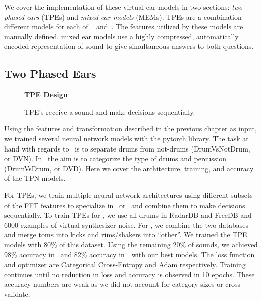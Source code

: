 \documentclass[\main/thesis.tex]{subfiles}
\begin{document}
We cover the implementation of these virtual ear models in two sections: \emph{two phased ears} (TPEs) and \emph{mixed ear models} (MEMs). TPEs are a combination different models for each of ~ and~. The features utilized by these models are manually defined. mixed ear models use a highly compressed, automatically encoded representation of sound to give simultaneous answers to both questions.


\subsection{Two Phased Ears}
\begin{figure}[t!]
    \begin{center}
    \textbf{TPE Design}
    \end{center}
    \caption{TPE's receive a sound and make decisions sequentially.}
\label{fig:TPE_design}
\end{figure}


\label{TPE_models}
Using the features and transformation described in the previous chapter as input, we trained several neural network models with the pytorch library. The task at hand with regards to \decfirst~is to separate drums from not-drums (DrumVsNotDrum, or DVN). In \decsecond~the aim is to categorize the type of drums and percussion (DrumVsDrum, or DVD). Here we cover the architecture, training, and accuracy of the TPN models.

 For TPEs, we train multiple neural network architectures using different subsets of the FFT features to specialize in \decfirst~or \decsecond~and combine them to make decisions sequentially. To train TPEs for \decfirst, we use all drums in RadarDB and FreeDB and 6000 examples of virtual synthesizer noise. For \decsecond, we combine the two databases and merge toms into kicks and rims/shakers into \enquote{other}. We trained the TPE models with 80\% of this dataset. Using the remaining 20\% of sounds, we achieved 98\% accuracy in \decfirst~and 82\% accuracy in~\decsecond~with our best models.  The loss function and optimizer are Categorical Cross-Entropy and Adam respectively. Training continues until no reduction in loss and accuracy is observed in 10 epochs. These accuracy numbers are weak as we did not account for category sizes or cross validate.  
\end{document}
